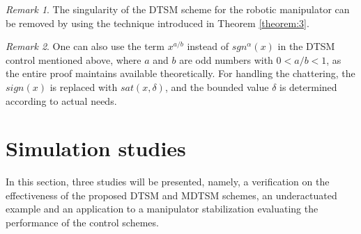\documentclass[3p]{elsarticle}
\theoremstyle{plain}
\theoremstyle{remark}
\newtheorem{myrem}{Remark}
\begin{document}
\begin{myrem}
The singularity of the DTSM scheme for the robotic manipulator can be removed by using the technique introduced in Theorem \ref{theorem:3}.
\end{myrem}
\begin{myrem}
One can also use the term $x^{a/b}$ instead of $sgn^\alpha(x)$ in the DTSM control mentioned above, where $a$ and $b$ are odd numbers with $0<a/b<1$, as the entire proof maintains available theoretically. For handling the chattering, the $sign(x)$ is replaced with $sat(x,\delta)$, and the bounded value $\delta$ is determined according to actual needs.
\end{myrem}
\section{Simulation studies}\label{sec:4}
In this section, three studies will be presented, namely, a verification on the effectiveness of the proposed DTSM and MDTSM schemes, an underactuated example and an application to a manipulator stabilization evaluating the performance of the control schemes.
\end{document}
